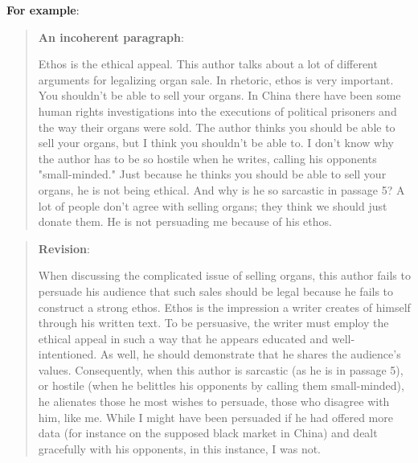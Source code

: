  
\textbf{For example}:

\begin{quote}
\textbf{An incoherent paragraph}: 

Ethos is the ethical appeal. This author talks about a lot of different arguments for 
legalizing organ sale. In rhetoric, ethos is very important. You shouldn't be able to sell 
your organs. In China there have been some human rights investigations into the 
executions of political prisoners and the way their organs were sold. The author thinks 
you should be able to sell your organs, but I think you shouldn't be able to.  I don't know 
why the author has to be so hostile when he writes, calling his opponents 
"small-minded."  Just because he thinks you should be able to sell your organs, he is 
not being ethical.  And why is he so sarcastic in passage 5?  A lot of people don't agree 
with selling organs; they think we should just donate them. He is not persuading me 
because of his ethos.
\end{quote}

\begin{quote}
\textbf{Revision}:
          
When discussing the complicated issue of  selling organs, this author fails to persuade 
his audience that such sales should be legal because he fails to construct a strong ethos.  
Ethos is the impression a writer creates of himself through his written text. To be 
persuasive, the writer must employ the ethical appeal in such a way that he appears 
educated and well-intentioned. As well, he should demonstrate that he shares the 
audience's values. Consequently, when this author is sarcastic (as he is in passage 5), or 
hostile (when he belittles his opponents by calling them small-minded),  he alienates 
those he most wishes to persuade, those who disagree with him, like me. While I might 
have been persuaded if he had offered more data (for instance on the supposed black 
market in China) and dealt gracefully with his opponents, in this instance, I was not.

\end{quote}


